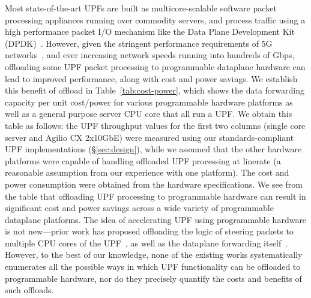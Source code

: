 Most state-of-the-art UPFs are built as multicore-scalable software packet processing appliances running over commodity servers, and process traffic using a high performance packet I/O mechanism like the Data Plane Development Kit (DPDK)~\cite{dpdk_overview}. However, given the stringent performance requirements of 5G networks~\cite{ngmn, 5g-iot-chk}, and ever increasing network speeds running into hundreds of Gbps, offloading some UPF packet processing to programmable dataplane hardware can lead to improved performance, along with cost and power savings. We establish this benefit of offload in Table~\ref{tab:cost-power}, which shows the data forwarding capacity per unit cost/power for various programmable hardware platforms as well as a general purpose server CPU core that all run a UPF. We obtain this table as follows: the UPF throughput values for the first two columns (single core server and Agilio CX 2x10GbE) were measured using our standards-compliant UPF implementations (\S\ref{sec:design}), while we assumed that the other hardware platforms were capable of handling offloaded UPF processing at linerate (a reasonable assumption from our experience with one platform). The cost and power consumption were obtained from the hardware specifications. We see from the table that offloading UPF processing to programmable hardware can result in significant cost and power savings across a wide variety of programmable dataplane platforms. The idea of accelerating UPF using programmable hardware is not new---prior work  has proposed offloading the logic of steering packets to multiple CPU cores of the UPF~\cite{astri, intel_wp, mavenir, metaswitch}, as well as the dataplane forwarding itself~\cite{astri, mobile_5G_hw1, mobile_5G_hw2, mavenir, kaloom_wp}. However, to the best of our knowledge, none of the existing works systematically enumerates all the possible ways in which UPF functionality can be offloaded to programmable hardware, nor do they precisely quantify the costs and benefits of such offloads. 



